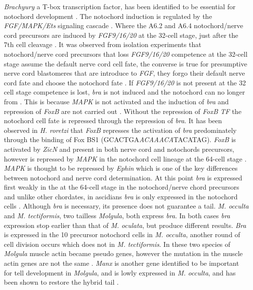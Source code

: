 \textit{Brachyury} a T-box transcription factor, has been identified to be essential for notochord development \cite{yasuo_conservation_1998}. The notochord induction is regulated by the \textit{FGF/MAPK/Ets} signaling cascade \cite{minokawa_binary_2001}. Where the A6.2 and A6.4 notochord/nerve cord precursors are induced by \textit{FGF9/16/20} at the 32-cell stage, just after the 7th cell cleavage \cite{satoh_ascidian_2001}. It was observed from isolation experiments that notochord/nerve cord precursors that loss \textit{FGF9/16/20} competence at the 32-cell stage assume the default nerve cord cell fate, the converse is true for presumptive nerve cord blastomeres that are introduce to \textit{FGF}, they forgo their default nerve cord fate and choose the notochord fate \cite{yasuo_conservation_1998,minokawa_binary_2001}. If \textit{FGF9/16/20} is not present at the 32 cell stage competence is lost, \textit{bra} is not induced and the notochord can no longer from \cite{nakatani_basic_1996,nakatani_duration_1999}. This is because \textit{MAPK} is not activated and the induction of \textit{bra} and repression of \textit{FoxB} are not carried out \cite{hashimoto_transcription_2011}. Without the repression of \textit{FoxB TF} the notochord cell fate is repressed through the repression of \textit{bra}. It has been observed in \textit{H. roretzi} that \textit{FoxB} represses the activation of \textit{bra} predominately through the binding of Fox BS1 (GCACTGA\textit{ACAAACA}TACATAG). \textit{FoxB} is activated by \textit{ZicN} and present in both nerve cord and notochords precursors, however is repressed by \textit{MAPK} in the notochord cell lineage at the 64-cell stage \cite{hashimoto_transcription_2011}. \textit{MAPK} is thought to be repressed by \textit{Ephin} which is one of the key differences between notochord and nerve cord determination. At this point \textit{bra} is expressed first weakly in the at the 64-cell stage in the notochord/nerve chord precursors \cite{yasuo_ascidian_1994} and unlike other chordates, in ascidians \textit{bra} is only expressed in the notochord cells \cite{yasuo_function_1993,corbo_characterization_1997,hotta_temporal_1999,takada_brachyury_2002}. Although \textit{bra} is necessary, its presence does not guarantee a tail. \textit{M. occulta} and \textit{M. tectiformis}, two tailless \textit{Molgula}, both express \textit{bra}. In both cases \textit{bra} expression stop earlier than that of \textit{M. oculata}, but produce different results. \textit{Bra} is expressed in the 10 precursor notochord cells in \textit{M. occulta}, another round of cell division occurs which does not in \textit{M. tectiformis}.  In these two species of \textit{Molgula} muscle actin became pseudo genes, however the mutation in the muscle actin genes are not the same \cite{swalla_novel_1993,jeffery_evolution_1999}. \textit{Manx} is another gene identified to be important for tell development in \textit{Molgula}, and is lowly expressed in \textit{M. occulta}, and has been shown to restore the hybrid tail \cite{swalla_requirement_1996, swalla_multigene_1999}. 
  
